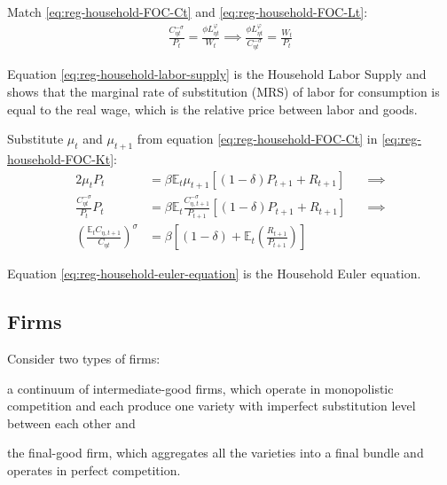 \documentclass[
	thesis.tex
	]{subfiles}
\begin{document}
Match \ref{eq:reg-household-FOC-Ct} and \ref{eq:reg-household-FOC-Lt}:
\begin{align}
	\label{eq:reg-household-labor-supply}
	\frac{C_{\eta t}^{-\sigma}}{P_t} = \frac{\phi L_{\eta t}^{\varphi}}{W_t} \implies 
	\frac{\phi L_{\eta t}^{\varphi}}{C_{\eta t}^{-\sigma}} = \frac{W_t}{P_t}
\end{align}

Equation \ref{eq:reg-household-labor-supply} is the Household Labor Supply and shows that the marginal rate of substitution (MRS) of labor for consumption is equal to the real wage, which is the relative price between labor and goods.

Substitute $\mu_t$ and $\mu_{t+1}$ from equation \ref{eq:reg-household-FOC-Ct} in \ref{eq:reg-household-FOC-Kt}:
\begin{alignat}{2}
	\mu_t P_t & = \beta \mathbb{E}_t \mu_{t+1} [(1-\delta) P_{t+1} + R_{t+1}] \quad &\implies \nonumber \\
	\frac{C_{\eta t}^{-\sigma}}{P_t} P_t & = \beta \mathbb{E}_t \frac{C_{\eta, t+1}^{-\sigma}}{P_{t+1}} [(1-\delta) P_{t+1} + R_{t+1}] &\implies \nonumber \\
	\left( \frac{\mathbb{E}_t C_{\eta, t+1}}{C_{\eta t}} \right)^\sigma & = \beta \left[ (1-\delta) + \mathbb{E}_t \left(\frac{R_{t+1}}{P_{t+1}}\right) \right] \label{eq:reg-household-euler-equation}
\end{alignat}

Equation \ref{eq:reg-household-euler-equation} is the Household Euler equation.


\subsection*{Firms}

Consider two types of firms: 
\begin{enumerate*}[label=(\arabic*)]
	\item a continuum of intermediate-good firms, which operate in monopolistic competition and each produce one variety with imperfect substitution level between each other and
	
	\item the final-good firm, which aggregates all the varieties into a final bundle and operates in perfect competition.
\end{enumerate*}
\end{document}
